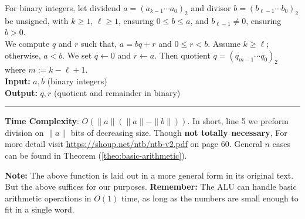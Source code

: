 \vspace{-.5em}
\begin{Func}

    \label{func:QuoRem}

    For binary integers, let dividend $a = (a_{k-1} \cdots a_0)_2$ and divisor $b = (b_{\ell-1} \cdots b_0)_2$ be unsigned, with $k \geq 1$,
    $\ell \geq 1$, ensuring $0 \leq b \leq a$, and $b_{\ell-1} \neq 0$, ensuring $b > 0$.\\ 
    
    \noindent
    We compute $q$ and $r$ such that, $a = bq + r$ and $0 \leq r < b$. 
    Assume $k \geq \ell$; otherwise, $a < b$. We set $q \gets 0$ and $r \gets a$. 
    Then quotient $q = (q_{m-1} \cdots q_0)_2$ where $m := k - \ell + 1$.\\

    \noindent
    \textbf{Input:} $a, b$ (binary integers)\\
    \noindent
    \textbf{Output:} $q, r$ (quotient and remainder in binary)\\
    \begin{algorithm}[H]
        \SetAlgoLined
    \end{algorithm}
    \noindent\rule{\textwidth}{0.4pt}
    \noindent

    \noindent
    \textbf{Time Complexity}: $O(\|a\|(\|a\| - \|b\|))$. In short, line 5 we preform division on $\|a\|$ bits of decreasing size. 
    Though \textbf{not totally necessary}, For more
    detail visit \url{https://shoup.net/ntb/ntb-v2.pdf} on page 60. General $n$ cases can be found in Theorem (\ref{theo:basic-arithmetic}).
\end{Func}

\begin{Note}
    \textbf{Note:} The above function is laid out in a more general form in its original text. But the above suffices for 
    our purposes. \textbf{Remember:} The ALU can handle basic arithmetic operations in $O(1)$ time, as long as the numbers are small enough to fit in a single word.
\end{Note}

